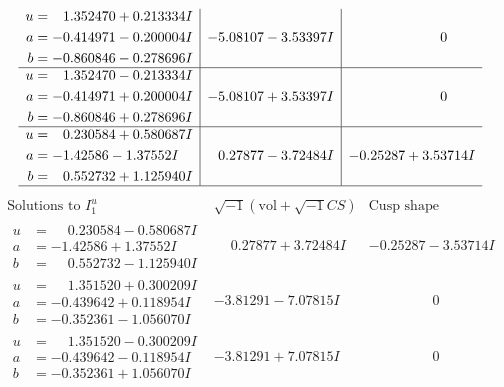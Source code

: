 \documentclass[1p]{elsarticle_modified}
\theoremstyle{definition}
\newcommand{\I}{\sqrt{-1}}
\begin{document}
$$\begin{array}{c|c|c}
\begin{aligned}
u &= \phantom{-}1.352470 + 0.213334 I \\
a &= -0.414971 - 0.200004 I \\
b &= -0.860846 - 0.278696 I\end{aligned}
 & -5.08107 - 3.53397 I & \phantom{-0.000000 } 0 \\ \hline\begin{aligned}
u &= \phantom{-}1.352470 - 0.213334 I \\
a &= -0.414971 + 0.200004 I \\
b &= -0.860846 + 0.278696 I\end{aligned}
 & -5.08107 + 3.53397 I & \phantom{-0.000000 } 0 \\ \hline\begin{aligned}
u &= \phantom{-}0.230584 + 0.580687 I \\
a &= -1.42586 - 1.37552 I \\
b &= \phantom{-}0.552732 + 1.125940 I\end{aligned}
 & \phantom{-}0.27877 - 3.72484 I & -0.25287 + 3.53714 I\\
 \hline 
 \end{array}$$\newpage$$\begin{array}{c|c|c}  
\text{Solutions to }I^u_{1}& \I (\text{vol} + \sqrt{-1}CS) & \text{Cusp shape}\\
 \hline 
\begin{aligned}
u &= \phantom{-}0.230584 - 0.580687 I \\
a &= -1.42586 + 1.37552 I \\
b &= \phantom{-}0.552732 - 1.125940 I\end{aligned}
 & \phantom{-}0.27877 + 3.72484 I & -0.25287 - 3.53714 I \\ \hline\begin{aligned}
u &= \phantom{-}1.351520 + 0.300209 I \\
a &= -0.439642 + 0.118954 I \\
b &= -0.352361 - 1.056070 I\end{aligned}
 & -3.81291 - 7.07815 I & \phantom{-0.000000 } 0 \\ \hline\begin{aligned}
u &= \phantom{-}1.351520 - 0.300209 I \\
a &= -0.439642 - 0.118954 I \\
b &= -0.352361 + 1.056070 I\end{aligned}
 & -3.81291 + 7.07815 I & \phantom{-0.000000 } 0 \\ \hline\begin{aligned}

\end{aligned}
\end{array}$$
\end{document}
